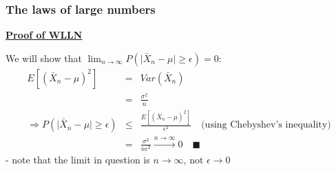 \documentclass[t,8pt]{beamer}%
\begin{document}
\begin{frame}
	\frametitle{The laws of large numbers}
        {\bf\underline{Proof of WLLN}} \par
        We will show that $\lim_{n\rightarrow\infty}P\left(\vert\bar X_n-\mu\vert\geq\epsilon\right)=0$:
        \begin{eqnarray*}
		E[(\bar X_n-\mu)^2]&=&Var(\bar X_n)\\
        &=&\frac{\sigma^2}n\\
        \Rightarrow P\left(\vert\bar X_n-\mu\vert\geq\epsilon\right)&\leq&\frac{E[(\bar X_n-\mu)^2]}{\epsilon^2}\quad\text{(using Chebyshev's inequality)}\\
        &=&\frac{\sigma^2}{n\epsilon^2}\xrightarrow{\text{$n\rightarrow\infty$}}0\quad\blacksquare
	\end{eqnarray*}
    {\small\color{NavyBlue} - note that the limit in question is $n\rightarrow\infty$, not $\epsilon\rightarrow 0$}
\end{frame}

\end{document}
